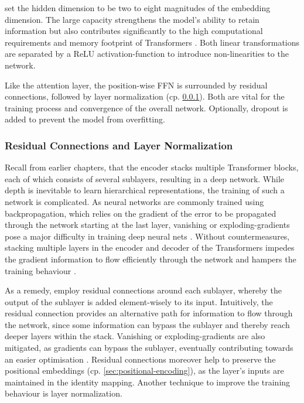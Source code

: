 \textcite[][9]{vaswaniAttentionAllYou2017} set the hidden dimension to be two to eight magnitudes of the embedding dimension. The large capacity strengthens the model's ability to retain information but also contributes significantly to the high computational requirements and memory footprint of Transformers \autocites[][5]{tayEfficientTransformersSurvey2022}[][1]{kitaevReformerEfficientTransformer2020}. Both linear transformations are separated by a \gls{ReLU} \gls{activation-function} \autocite[][318]{glorotDeepSparseRectifier2011} to introduce non-linearities to the network.

Like the attention layer, the position-wise \gls{FFN} is surrounded by residual connections, followed by layer normalization (cp. \cref{sec:residual-connections-layer-norm}). Both are vital for the training process and convergence of the overall network. Optionally, dropout \autocite[][1930]{srivastavaDropoutSimpleWay} is added to prevent the model from \gls{overfitting}.

\subsubsection{Residual Connections and Layer Normalization}\label{sec:residual-connections-layer-norm}

Recall from earlier chapters, that the encoder stacks multiple Transformer blocks, each of which consists of several sublayers, resulting in a deep network. While depth is inevitable to learn hierarchical representations, the training of such a network is complicated. As neural networks are commonly trained using backpropagation, which relies on the gradient of the error to be propagated through the network starting at the last layer, vanishing or \glspl{exploding-gradient} pose a major difficulty in training deep neural nets \autocite[][1]{heDeepResidualLearning2015}. Without countermeasures, stacking multiple layers in the encoder and decoder of the Transformers impedes the gradient information to flow efficiently through the network and hampers the training behaviour \autocite[][1811]{wangLearningDeepTransformer2019}.

As a remedy, \textcite[][3]{vaswaniAttentionAllYou2017} employ residual connections around each sublayer, whereby the output of the sublayer is added element-wisely to its input. Intuitively, the residual connection provides an alternative path for information to flow through the network, since some information can bypass the sublayer and thereby reach deeper layers within the stack. Vanishing or \glspl{exploding-gradient} are also mitigated, as gradients can bypass the sublayer, eventually contributing towards an easier optimisation \autocite[][3591]{liuRethinkingSkipConnection2020}. Residual connections moreover help to preserve the positional embeddings (cp. \cref{sec:positional-encoding}), as the layer's inputs are maintained in the identity mapping. Another technique to improve the training behaviour is layer normalization.


